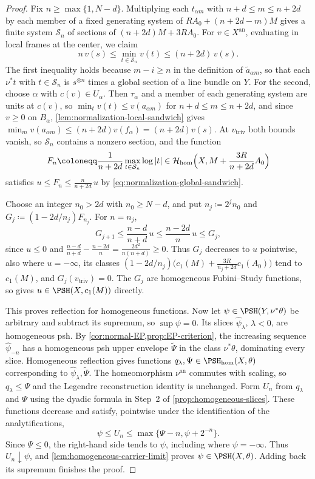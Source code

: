 \documentclass[11pt,a4paper]{article}
\newcommand{\an}{\mathrm{an}}          %
\newcommand{\vtriv}{v_{\mathrm{triv}}} %
\newcommand{\PSHhom}{\PSH_{\mathrm{hom}}}          %
\begin{document}
\begin{proof}
Fix $n\geq\max\{1,N-d\}$. Multiplying each $t_{\alpha m}$ with $n+d\leq m\leq n+2d$ by each member of a fixed generating system of $RA_0+(n+2d-m)M$ gives a finite system $\mathcal S_n$ of sections of $(n+2d)M+3RA_0$. For $v\in X^{\an}$, evaluating in local frames at the center, we claim
\begin{equation}\label{eq:normalization-global-sandwich}
 n\,v(s)\leq\min_{t\in\mathcal S_n}v(t)\leq(n+2d)\,v(s).
\end{equation}
The first inequality holds because $m-i\geq n$ in the definition of $\widetilde a_{\alpha m}$, so that each $\nu^*t$ with $t\in\mathcal S_n$ is $s^{\otimes n}$ times a global section of a line bundle on $Y$. For the second, choose $\alpha$ with $c(v)\in U_\alpha$. Then $\tau_\alpha$ and a member of each generating system are units at $c(v)$, so $\min_tv(t)\leq v(a_{\alpha m})$ for $n+d\leq m\leq n+2d$, and since $v\geq0$ on $B_\alpha$, \cref{lem:normalization-local-sandwich} gives $\min_mv(a_{\alpha m})\leq(n+2d)v(f_\alpha)=(n+2d)v(s)$. At $\vtriv$ both bounds vanish, so $\mathcal S_n$ contains a nonzero section, and the function
\[
 F_n\coloneqq\frac1{n+2d}\max_{t\in\mathcal S_n}\log|t|\in\mathcal{H}_{\mathrm{hom}}\Bigl(X,M+\frac{3R}{n+2d}A_0\Bigr)
\]
satisfies $u\leq F_n\leq\frac n{n+2d}\,u$ by \eqref{eq:normalization-global-sandwich}.

Choose an integer $n_0>2d$ with $n_0\geq N-d$, and put $n_j\coloneqq2^jn_0$ and $G_j\coloneqq(1-2d/n_j)F_{n_j}$. For $n=n_j$,
\[
 G_{j+1}\leq\frac{n-d}{n+d}\,u\leq\frac{n-2d}{n}\,u\leq G_j,
\]
since $u\leq0$ and $\frac{n-d}{n+d}-\frac{n-2d}n=\frac{2d^2}{n(n+d)}\geq0$. Thus $G_j$ decreases to $u$ pointwise, also where $u=-\infty$, its classes $(1-2d/n_j)\bigl(c_1(M)+\frac{3R}{n_j+2d}c_1(A_0)\bigr)$ tend to $c_1(M)$, and $G_j(\vtriv)=0$. The $G_j$ are homogeneous Fubini--Study functions, so \cite[Definition~4.1]{BJ22} gives $u\in\PSH(X,c_1(M))$ directly.

This proves reflection for homogeneous functions. Now let $\psi\in\PSH(Y,\nu^*\theta)$ be arbitrary and subtract its supremum, so $\sup\psi=0$. Its slices $\widehat\psi_\lambda$, $\lambda<0$, are homogeneous psh. By \cref{cor:normal-EP,prop:EP-criterion}, the increasing sequence $\widehat\psi_{-n}$ has a homogeneous psh upper envelope $\widetilde\Psi$ in the class $\nu^*\theta$, dominating every slice. Homogeneous reflection gives functions $q_\lambda,\Psi\in\PSHhom(X,\theta)$ corresponding to $\widehat\psi_\lambda,\widetilde\Psi$. The homeomorphism $\nu^{\an}$ commutes with scaling, so $q_\lambda\le\Psi$ and the Legendre reconstruction identity is unchanged. Form $U_n$ from $q_\lambda$ and $\Psi$ using the dyadic formula in Step~2 of \cref{prop:homogeneous-slices}. These functions decrease and satisfy, pointwise under the identification of the analytifications,
\[
 \psi\le U_n\le\max\{\Psi-n,\psi+2^{-n}\}.
\]
Since $\Psi\le0$, the right-hand side tends to $\psi$, including where $\psi=-\infty$. Thus $U_n\downarrow\psi$, and \cref{lem:homogeneous-carrier-limit} proves $\psi\in\PSH(X,\theta)$. Adding back its supremum finishes the proof.
\end{proof}
\end{document}
